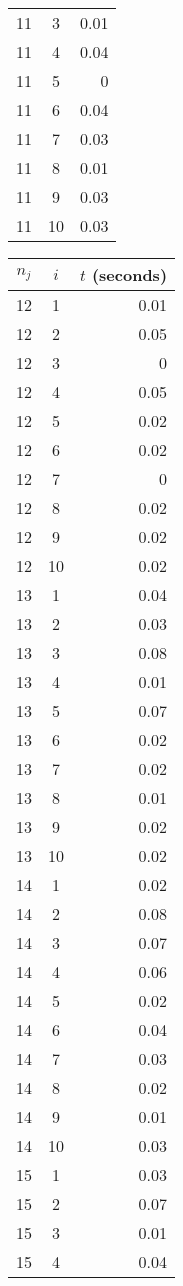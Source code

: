 \documentclass[13pt, letterpaper, oneside]{book}
\begin{document}
\begin{multicols}{5}
\begin{tabular}{c c r}
11 & 3 & 0.01 \\
11 & 4 & 0.04 \\
11 & 5 & 0 \\
11 & 6 & 0.04 \\
11 & 7 & 0.03 \\
11 & 8 & 0.01 \\
11 & 9 & 0.03 \\
11 & 10 & 0.03 \\
\bottomrule
\end{tabular}
\vfill
\columnbreak
\begin{tabular}{c c r}
\toprule
$n_j$ & $i$ & $t$ (seconds) \\
\midrule 
12 & 1 & 0.01 \\
12 & 2 & 0.05 \\
12 & 3 & 0 \\
12 & 4 & 0.05 \\
12 & 5 & 0.02 \\
12 & 6 & 0.02 \\
12 & 7 & 0 \\
12 & 8 & 0.02 \\
12 & 9 & 0.02 \\
12 & 10 & 0.02 \\
13 & 1 & 0.04 \\
13 & 2 & 0.03 \\
13 & 3 & 0.08 \\
13 & 4 & 0.01 \\
13 & 5 & 0.07 \\
13 & 6 & 0.02 \\
13 & 7 & 0.02 \\
13 & 8 & 0.01 \\
13 & 9 & 0.02 \\
13 & 10 & 0.02 \\
14 & 1 & 0.02 \\
14 & 2 & 0.08 \\
14 & 3 & 0.07 \\
14 & 4 & 0.06 \\
14 & 5 & 0.02 \\
14 & 6 & 0.04 \\
14 & 7 & 0.03 \\
14 & 8 & 0.02 \\
14 & 9 & 0.01 \\
14 & 10 & 0.03 \\
15 & 1 & 0.03 \\
15 & 2 & 0.07 \\
15 & 3 & 0.01 \\
15 & 4 & 0.04 \\

\end{tabular}
\end{multicols}
\end{document}
